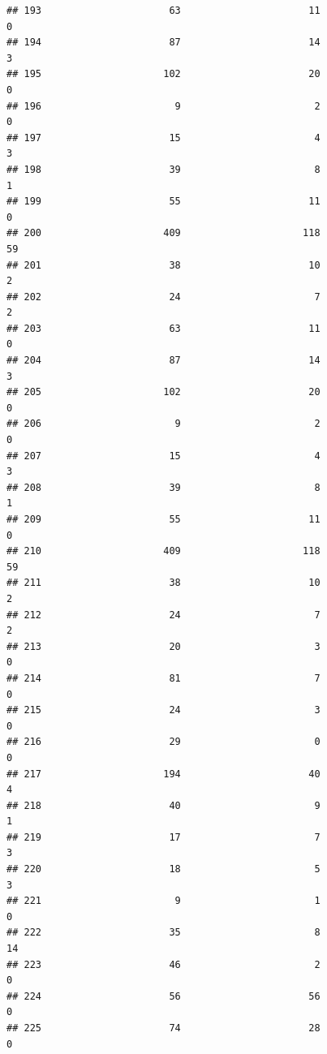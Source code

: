 \documentclass[
]{article}
\begin{document}
\begin{verbatim}
## 193                      63                      11                        0
## 194                      87                      14                        3
## 195                     102                      20                        0
## 196                       9                       2                        0
## 197                      15                       4                        3
## 198                      39                       8                        1
## 199                      55                      11                        0
## 200                     409                     118                       59
## 201                      38                      10                        2
## 202                      24                       7                        2
## 203                      63                      11                        0
## 204                      87                      14                        3
## 205                     102                      20                        0
## 206                       9                       2                        0
## 207                      15                       4                        3
## 208                      39                       8                        1
## 209                      55                      11                        0
## 210                     409                     118                       59
## 211                      38                      10                        2
## 212                      24                       7                        2
## 213                      20                       3                        0
## 214                      81                       7                        0
## 215                      24                       3                        0
## 216                      29                       0                        0
## 217                     194                      40                        4
## 218                      40                       9                        1
## 219                      17                       7                        3
## 220                      18                       5                        3
## 221                       9                       1                        0
## 222                      35                       8                       14
## 223                      46                       2                        0
## 224                      56                      56                        0
## 225                      74                      28                        0

\end{verbatim}
\end{document}
